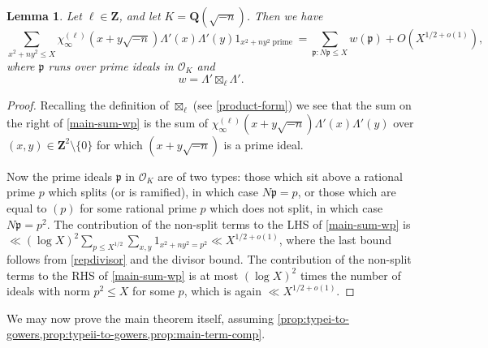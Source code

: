 \documentclass[11pt,reqno]{amsart}
\numberwithin{equation}{section}
\newtheorem{lemma}[theorem]{Lemma}
\theoremstyle{definition}
\theoremstyle{remark}
\newcommand{\mf}{\mathfrak}
\renewcommand{\le}{\leqslant}
\newcommand\Z{\mathbf{Z}}
\newcommand\Q{\mathbf{Q}}
\renewcommand\O{\mathcal{O}}
\begin{document}
\begin{lemma}\label{lem:sums-to-ideals}
Let $\ell \in \Z$, and let $K = \Q(\sqrt{-n})$. Then we have
\begin{equation}\label{main-sum-wp} \sum_{x^2 + ny^2 \le X}\chi_{\infty}^{(\ell)}(x + y \sqrt{-n}) \Lambda'(x) \Lambda'(y) 1_{x^2 + ny^2 \operatorname{prime}} = \sum_{\mf{p} : N\mf{p} \le X} w(\mf{p}) + O(X^{1/2 + o(1)}),\end{equation} where $\mf{p}$ runs over prime ideals in $\O_K$ and 
\begin{equation}\label{w-von-m}  w = \Lambda' \boxtimes_{\ell} \Lambda' . \end{equation} \end{lemma}
\begin{proof}
Recalling the definition of $\boxtimes_{\ell}$ (see \cref{product-form}) we see that the sum on the right of \cref{main-sum-wp} is the sum of $\chi_{\infty}^{(\ell)}(x + y \sqrt{-n})\Lambda'(x)\Lambda'(y)$ over $(x,y) \in \Z^2 \setminus \{0\}$ for which $(x + y \sqrt{-n})$ is a prime ideal.

Now the prime ideals $\mf{p}$ in $\O_K$ are of two types: those which sit above a rational prime $p$ which splits (or is ramified), in which case $N\mf{p} = p$, or those which are equal to $(p)$ for some rational prime $p$ which does not split, in which case $N\mf{p} = p^2$. The contribution of the non-split terms to the LHS of \cref{main-sum-wp} is $\ll (\log X)^2 \sum_{p \le X^{1/2}}\sum_{x,y} 1_{x^2 + ny^2 = p^2} \ll X^{1/2 + o(1)}$, where the last bound follows from \cref{repdivisor} and the divisor bound. The contribution of the non-split terms to the RHS of \cref{main-sum-wp} is at most $(\log X)^2$ times the number of ideals with norm $p^2 \le X$ for some $p$, which is again $\ll X^{1/2 + o(1)}$.
\end{proof}

We may now prove the main theorem itself, assuming \cref{prop:typei-to-gowers,prop:typeii-to-gowers,prop:main-term-comp}.
\end{document}
